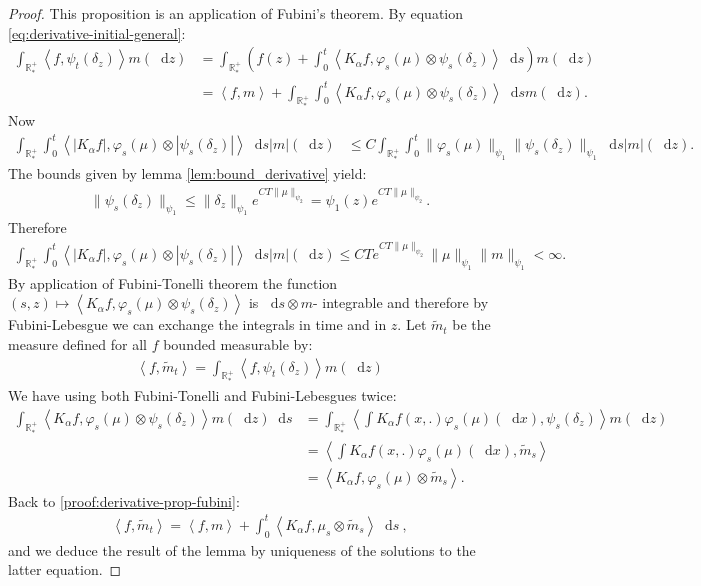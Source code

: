 \documentclass[11pt,a4paper]{article}
\newcommand{\RRP}{\mathbb{R}^+_*}
\newcommand{\brac}[1]{\left\langle#1\right\rangle}
\newcommand{\dd}{\mathop{}\!\mathrm{d}}
\begin{document}
\begin{proof}
    This proposition is an application of Fubini's theorem. By equation \eqref{eq:derivative-initial-general}:
    \begin{align}
        \int_{\RRP} \brac{f,\psi_t\left(\delta_z\right)}m(\dd z) &= \int_{\RRP}\left( f(z) + \int_0^t \brac{K_\alpha f,\varphi_s(\mu)\otimes\psi_s\left(\delta_z\right)} \dd s \right)m(\dd z) \nonumber\\
        &= \brac{f,m} + \int_{\RRP}\int_0^t \brac{K_\alpha f,\varphi_s(\mu)\otimes\psi_s\left(\delta_z\right)} \dd sm(\dd z).\label{proof:derivative-prop-fubini}
    \end{align}
    Now 
    \begin{align*}
        \int_{\RRP}\int_0^t \brac{ |K_\alpha f|,\varphi_s(\mu)\otimes|\psi_s\left(\delta_z\right)|} \dd s |m|(\dd z) 
        &\leq C\int_{\RRP}\int_0^t\|\varphi_s(\mu)\|_{\psi_1}  \|\psi_s(\delta_z)\|_{\psi_1}\dd s |m|(\dd z).
    \end{align*}
    The bounds given by lemma \ref{lem:bound_derivative} yield: 
    \begin{align*}
        \|\psi_s(\delta_z)\|_{\psi_1} \leq \|\delta_z\|_{\psi_1}e^{CT\|\mu\|_{\psi_2}} = \psi_1(z)e^{CT\|\mu\|_{\psi_2}}.
    \end{align*}
    Therefore
    \begin{align*}
        \int_{\RRP}\int_0^t \brac{ |K_\alpha f|,\varphi_s(\mu)\otimes|\psi_s\left(\delta_z\right)|} \dd s |m|(\dd z)  \leq CT e^{CT\|\mu\|_{\psi_2}}\|\mu\|_{\psi_1}\|m\|_{\psi_1} < \infty.
    \end{align*}
    By application of Fubini-Tonelli theorem the function $(s,z) \mapsto \brac{ K_\alpha f,\varphi_s(\mu)\otimes\psi_s\left(\delta_z\right)}$ is $\dd s \otimes m$- integrable and therefore by Fubini-Lebesgue we can exchange the integrals in time and in $z$. Let $\tilde{m}_t$ be the measure defined for all $f$ bounded measurable by:
    \begin{align*}
        \brac{f,\tilde{m}_t} = \int_{\RRP} \brac{f,\psi_t\left(\delta_z\right)}m(\dd z)
    \end{align*}
    We have using both Fubini-Tonelli and Fubini-Lebesgues twice:
    \begin{align*}
        \int_{\RRP} \brac{K_\alpha f,\varphi_s(\mu)\otimes\psi_s\left(\delta_z\right)} m(\dd z) \dd s 
        &= \int_{\RRP} \brac{\int K_\alpha f(x,.)\varphi_s(\mu)(\dd x), \psi_s(\delta_z)} m(\dd z) \\
        &= \brac{\int K_\alpha f(x,.)\varphi_s(\mu)(\dd x),\tilde{m}_s} \\
        &= \brac{K_\alpha f, \varphi_s(\mu) \otimes \tilde{m}_s}.
    \end{align*}
    Back to \eqref{proof:derivative-prop-fubini}:
    \begin{align*}
        \brac{f,\tilde{m}_t} = \brac{f,m} + \int_0^t \brac{K_\alpha f, \mu_s \otimes \tilde{m}_s} \dd s\ ,
    \end{align*}
    and we deduce the result of the lemma by uniqueness of the solutions to the latter equation.
\end{proof}
\end{document}
